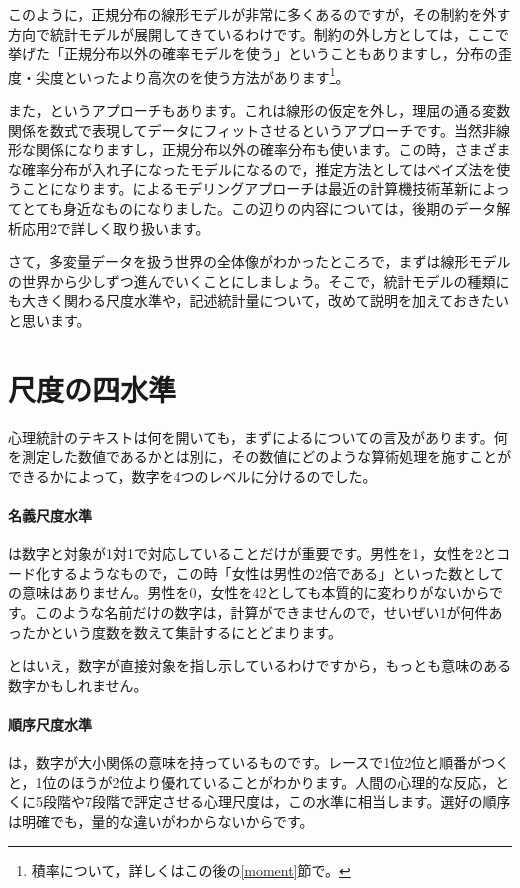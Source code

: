 \documentclass{ltjsbook}
\begin{document}
このように，正規分布の線形モデルが非常に多くあるのですが，その制約を外す方向で統計モデルが展開してきているわけです。制約の外し方としては，ここで挙げた「正規分布以外の確率モデルを使う」ということもありますし，分布の歪度・尖度といったより高次のを使う方法があります\footnote{積率について，詳しくはこの後の\ref{moment}節で。}。

また，というアプローチもあります。これは線形の仮定を外し，理屈の通る変数関係を数式で表現してデータにフィットさせるというアプローチです。当然非線形な関係になりますし，正規分布以外の確率分布も使います。この時，さまざまな確率分布が入れ子になったモデルになるので，推定方法としてはベイズ法を使うことになります。によるモデリングアプローチは最近の計算機技術革新によってとても身近なものになりました。この辺りの内容については，後期のデータ解析応用2で詳しく取り扱います。

さて，多変量データを扱う世界の全体像がわかったところで，まずは線形モデルの世界から少しずつ進んでいくことにしましょう。そこで，統計モデルの種類にも大きく関わる尺度水準や，記述統計量について，改めて説明を加えておきたいと思います。

\section{尺度の四水準}
心理統計のテキストは何を開いても，まず\textcite{stevens1946}によるについての言及があります。何を測定した数値であるかとは別に，その数値にどのような算術処理を施すことができるかによって，数字を4つのレベルに分けるのでした。

\paragraph{名義尺度水準} は数字と対象が1対1で対応していることだけが重要です。男性を1，女性を2とコード化するようなもので，この時「女性は男性の2倍である」といった数としての意味はありません。男性を0，女性を42としても本質的に変わりがないからです。このような名前だけの数字は，計算ができませんので，せいぜい1が何件あったかという度数を数えて集計するにとどまります。

とはいえ，数字が直接対象を指し示しているわけですから，もっとも意味のある数字かもしれません。

\paragraph{順序尺度水準} は，数字が大小関係の意味を持っているものです。レースで1位2位と順番がつくと，1位のほうが2位より優れていることがわかります。人間の心理的な反応，とくに5段階や7段階で評定させる心理尺度は，この水準に相当します。選好の順序は明確でも，量的な違いがわからないからです。
\end{document}
